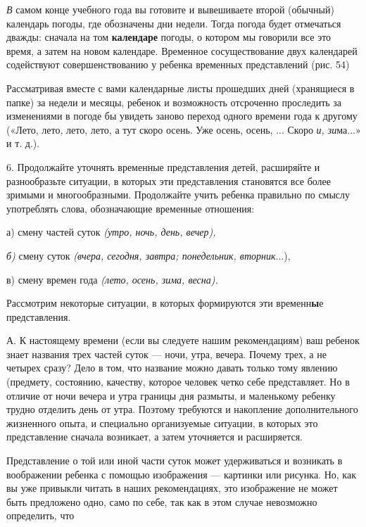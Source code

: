 \documentclass[a5paper]{book}
\renewcommand{\emph}[1]{\textit{#1}}
\begin{document}
\emph{В} самом конце учебного года вы готовите и вывешиваете второй
(обычный) календарь погоды, где обозначены дни недели. Тогда погода
будет отмечаться дважды: сначала на том \textbf{календаре} погоды, о
котором мы говорили все это время, а затем на новом календаре. Временное
сосуществование двух календарей содействуют совершенствованию у ребенка
временных представлений (рис. 54)

Рассматривая вместе с вами календарные листы прошедших дней (хранящиеся
в папке) за недели и месяцы, ребенок и возможность отсроченно проследить
за изменениями в погоде бы увидеть заново переход одного времени года к
другому («Лето, лето, лето, лето, а тут скоро осень. Уже осень, осень,
... Скоро \emph{и, зи}ма...» и т. д.).

6. Продолжайте уточнять временные представления детей, расширяйте и
разнообразьте ситуации, в которых эти представления становятся все более
зримыми и многообразными. Продолжайте учить ребенка правильно по смыслу
употреблять слова, обозначающие временные отношения:

а) смену частей суток \emph{(утро, ночь, день, вечер),}

\emph{б)} смену суток \emph{(вчера, сегодня, завтра; понедельник,
вторник}...),

в) смену времен года \emph{(лето, осень, зима, весна).}

Рассмотрим некоторые ситуации, в которых формируются эти
временн\textbf{ы}е представления.

А. К настоящему времени (если вы следуете нашим рекомендациям) ваш
ребенок знает названия трех частей суток --- ночи, утра, вечера. Почему
трех, а не четырех сразу? Дело в том, что название можно давать только
тому явлению (предмету, состоянию, качеству, которое человек четко себе
представляет. Но в отличие от ночи вечера и утра границы дня размыты, и
маленькому ребенку трудно отделить день от утра. Поэтому требуются и
накопление дополнительного жизненного опыта, и специально организуемые
ситуации, в которых это представление сначала возникает, а затем
уточняется и расширяется.

Представление о той или иной части суток может удерживаться и возникать
в воображении ребенка с помощью изображения --- картинки или рисунка.
Но, как вы уже привыкли читать в наших рекомендациях, это изображение не
может быть предложено одно, само по себе, так как в этом случае
невозможно определить, что
\end{document}

